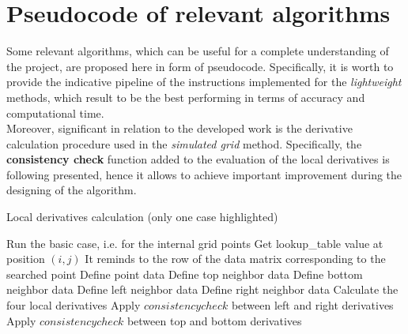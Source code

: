 \chapter{Pseudocode of relevant algorithms}
\label{chapter:pseudocode}

Some relevant algorithms, which can be useful for a complete understanding of the project, are proposed here in form of pseudocode.
Specifically, it is worth to provide the indicative pipeline of the instructions implemented for the \textit{lightweight} methods, which result to be the best performing in terms of accuracy and computational time.\\
Moreover, significant in relation to the developed work is the derivative calculation procedure used in the \textit{simulated grid} method.
Specifically, the \textbf{consistency check} function added to the evaluation of the local derivatives is following presented, hence it allows to achieve important improvement during the designing of the algorithm.

%		
%
\begin{algorithm}
	\caption{Local derivatives calculation (only one case highlighted)}
	\begin{algorithmic}[1]
				\State Run the basic case, i.e. for the internal grid points
					\State Get lookup\_table value at position $(i, j)$
					\State It reminds to the row of the data matrix corresponding to the searched point
					\State Define point data
					\State Define top neighbor data
					\State Define bottom neighbor data
					\State Define left neighbor data	
					\State Define right neighbor data
					\State Calculate the four local derivatives
					\State Apply $consistency check$ between left and right derivatives	
					\State Apply $consistency check$ between top and bottom derivatives
				\EndIf
			\EndFor
		\EndFor
	\end{algorithmic} 
	\label{alg:local-deriv-cal}
\end{algorithm} 

